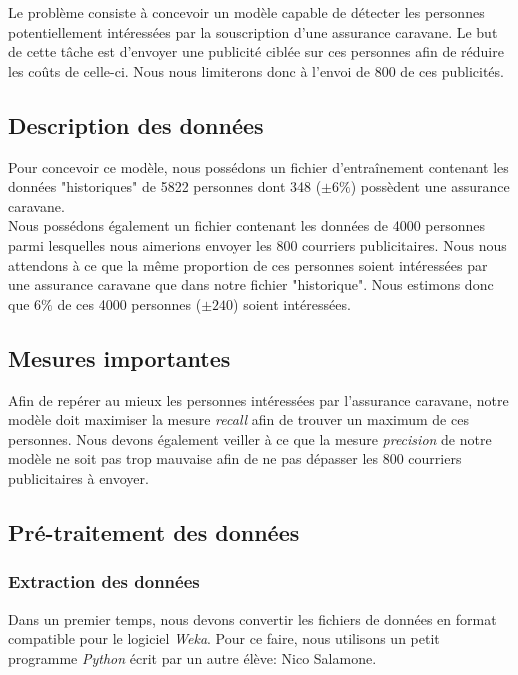 \documentclass[11pt,a4paper]{article}
\begin{document}
		   	Le problème consiste à concevoir un modèle capable de détecter les personnes potentiellement intéressées par la souscription d'une assurance caravane. Le but de cette tâche est d'envoyer une publicité ciblée sur ces personnes afin de réduire les coûts de celle-ci. Nous nous limiterons donc à l'envoi de 800 de ces publicités.\\
		   	
		\subsection{Description des données}
		   	
		   	Pour concevoir ce modèle, nous possédons un fichier d'entraînement contenant les données "historiques" de 5822 personnes dont 348 ($\pm6\%$) possèdent une assurance caravane.\\
		   	
		   	Nous possédons également un fichier contenant les données de 4000 personnes parmi lesquelles nous aimerions envoyer les 800 courriers publicitaires. Nous nous attendons à ce que la même proportion de ces personnes soient intéressées par une assurance caravane que dans notre fichier "historique". Nous estimons donc que $6\%$ de ces 4000 personnes ($\pm240$) soient intéressées.
		   	
		\subsection{Mesures importantes}
		
			Afin de repérer au mieux les personnes intéressées par l'assurance caravane, notre modèle doit maximiser la mesure \textit{recall} afin de trouver un maximum de ces personnes. Nous devons également veiller à ce que la mesure \textit{precision} de notre modèle ne soit pas trop mauvaise afin de ne pas dépasser les 800 courriers publicitaires à envoyer.
			
		\subsection{Pré-traitement des données}
		
			\subsubsection*{Extraction des données}
			
				Dans un premier temps, nous devons convertir les fichiers de données en format compatible pour le logiciel \textit{Weka}. Pour ce faire, nous utilisons un petit programme \textit{Python} écrit par un autre élève: Nico Salamone.
				
\end{document}
